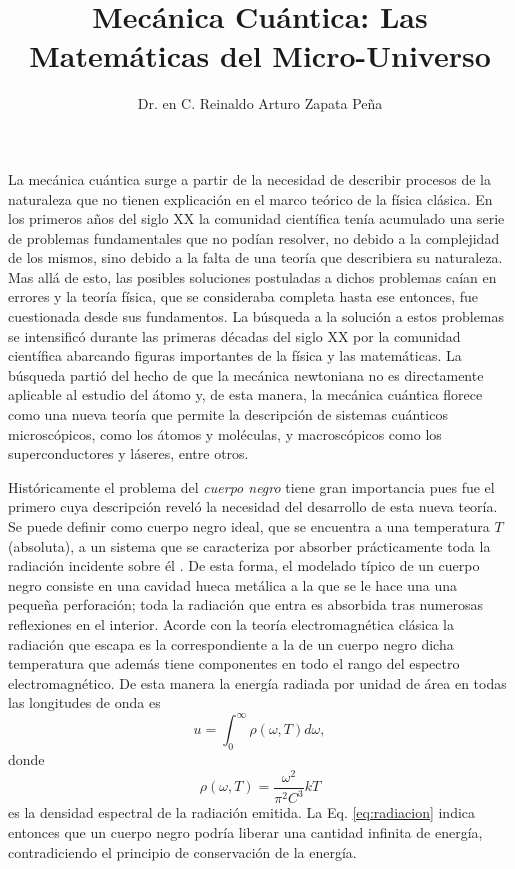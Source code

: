 \documentclass{article}
\title{Mecánica Cuántica: Las Matemáticas del Micro-Universo}
\author{Dr. en C. Reinaldo Arturo Zapata Peña}
\date{}
\begin{document}
\maketitle

La mecánica cuántica surge a partir de la necesidad de describir procesos de la
naturaleza que no tienen explicación en el marco teórico de la física clásica.
% 
En los primeros años del siglo XX la comunidad científica tenía acumulado una
serie de problemas fundamentales que no podían resolver, no debido a la
complejidad de los mismos, sino debido a la falta de una teoría que describiera
su naturaleza. 
% 
Mas allá de esto, las posibles soluciones postuladas a dichos problemas caían
en errores y la teoría física, que se consideraba completa hasta ese entonces,
fue cuestionada desde sus fundamentos.
% 
La búsqueda a la solución a estos problemas se intensificó durante las primeras
décadas del siglo XX por la comunidad científica abarcando figuras importantes
de la física y las matemáticas. La búsqueda partió del hecho de que la
mecánica newtoniana no es directamente aplicable al estudio del átomo y,
% 
de esta manera, la mecánica cuántica florece como una nueva teoría que permite
la descripción de sistemas cuánticos microscópicos, como los átomos y
moléculas, y macroscópicos como los superconductores y láseres, entre otros.

Históricamente el problema del \emph{cuerpo negro} tiene gran importancia pues
fue el primero cuya descripción reveló la necesidad del desarrollo de esta
nueva teoría. 
% 
Se puede definir como cuerpo negro ideal, que se encuentra a una temperatura
$T$ (absoluta), a un sistema que se caracteriza por absorber prácticamente toda
la radiación incidente sobre él \cite{planck2013theory}.
% 
De esta forma, el modelado típico de un cuerpo negro consiste en una cavidad
hueca metálica a la que se le hace una una pequeña perforación; toda la
radiación que entra es absorbida tras numerosas reflexiones en el interior.
% 
Acorde con la teoría electromagnética clásica la radiación que escapa es la
correspondiente a la de un cuerpo negro dicha temperatura que además tiene
componentes en todo el rango del espectro electromagnético. De esta manera la
energía radiada por unidad de área en todas las longitudes de onda es
\begin{equation}\label{eq:radiacion}
u = \int _{0}^{\infty} \rho (\omega, T) d\omega,
\end{equation}
donde 
% 
\begin{equation}
\rho(\omega, T) = \frac{\omega^2}{\pi^{2}C^{3}}kT
\end{equation}
% 
es la densidad espectral de la radiación emitida. La
Eq. \eqref{eq:radiacion} indica entonces que un cuerpo negro podría liberar una
cantidad infinita de energía, contradiciendo el principio de conservación de la
energía.
\end{document}
